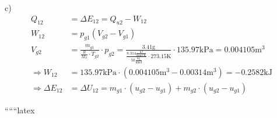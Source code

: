 c) 
\begin{align*}
    Q_{12} &= \Delta E_{12} = Q_{u2} - W_{12} \\
    W_{12} &= p_{g1} \left( V_{g2} - V_{g1} \right) \\
    V_{g2} &= \frac{m_{g1}}{\frac{R}{M_S} \cdot T_{g2}} \cdot p_{g2} = \frac{3.41 \text{g}}{\frac{8.314 \frac{\text{kJ}}{\text{kmol K}}}{50 \frac{\text{kg}}{\text{kmol}}} \cdot 273.15 \text{K}} \cdot 135.97 \text{kPa} = 0.004105 \text{m}^3 \\
    \Rightarrow W_{12} &= 135.97 \text{kPa} \cdot (0.004105 \text{m}^3 - 0.00314 \text{m}^3) = -0.2582 \text{kJ} \\
    \Rightarrow \Delta E_{12} &= \Delta U_{12} = m_{g1} \cdot (u_{g2} - u_{g1}) + m_{g2} \cdot (u_{g2} - u_{g1})
\end{align*}

``````latex